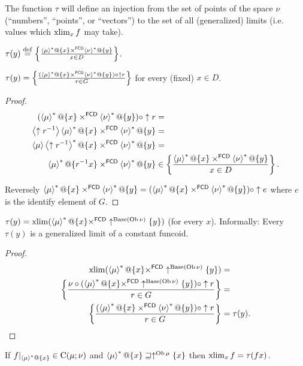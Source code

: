 The function $\tau$ will define an injection from the set of points
of the space $\nu$ (``numbers'', ``points'', or ``vectors'')
to the set of all (generalized) limits (i.e. values which $\operatorname{xlim}_{x}f$
may take).
\begin{defn}
$\tau(y)\overset{\mathrm{def}}{=}\left\{ \frac{\left\langle \mu\right\rangle ^{\ast}@\{x\}\times^{\mathsf{FCD}}\left\langle \nu\right\rangle ^{\ast}@\{y\}}{x\in D}\right\}$.\end{defn}
\begin{prop}
$\tau(y)=\left\{ \frac{(\left\langle \mu\right\rangle ^{\ast}@\{x\}\times^{\mathsf{FCD}}\left\langle \nu\right\rangle ^{\ast}@\{y\})\circ\uparrow r}{r\in G}\right\}$
for every (fixed) $x\in D$.\end{prop}
\begin{proof}
~
\begin{align*}
(\left\langle \mu\right\rangle ^{\ast}@\{x\}\times^{\mathsf{FCD}}\left\langle \nu\right\rangle ^{\ast}@\{y\})\circ\uparrow r & =\\
\left\langle \uparrow r^{-1}\right\rangle\left\langle \mu\right\rangle ^{\ast}@\{x\}\times^{\mathsf{FCD}}\left\langle \nu\right\rangle ^{\ast}@\{y\} & =\\
\left\langle \mu\right\rangle\left\langle \uparrow r^{-1}\right\rangle ^{\ast}@\{x\}\times^{\mathsf{FCD}}\left\langle \nu\right\rangle ^{\ast}@\{y\} & =\\
\left\langle \mu\right\rangle ^{\ast}@\{r^{-1}x\}\times^{\mathsf{FCD}}\left\langle \nu\right\rangle ^{\ast}@\{y\} & \in \left\{ \frac{\left\langle \mu\right\rangle ^{\ast}@\{x\}\times^{\mathsf{FCD}}\left\langle \nu\right\rangle ^{\ast}@\{y\}}{x\in D}\right\}.
\end{align*}


Reversely $\left\langle \mu\right\rangle ^{\ast}@\{x\}\times^{\mathsf{FCD}}\left\langle \nu\right\rangle ^{\ast}@\{y\}=(\left\langle \mu\right\rangle ^{\ast}@\{x\}\times^{\mathsf{FCD}}\left\langle \nu\right\rangle ^{\ast}@\{y\})\circ\uparrow e$
where $e$ is the identify element of $G$.\end{proof}
\begin{prop}
$\tau(y)=\operatorname{xlim}(\left\langle \mu\right\rangle ^{\ast}@\{x\}\times^{\mathsf{FCD}}\uparrow^{\operatorname{Base}(\operatorname{Ob}\nu)}\{y\})$
(for every $x$). Informally: Every $\tau(y)$ is a generalized limit
of a constant funcoid.\end{prop}
\begin{proof}
~
\begin{align*}
\operatorname{xlim}(\left\langle \mu\right\rangle ^{\ast}@\{x\}\times^{\mathsf{FCD}}\uparrow^{\operatorname{Base}(\operatorname{Ob}\nu)}\{y\}) & =\\
\left\{ \frac{\nu\circ(\left\langle \mu\right\rangle ^{\ast}@\{x\}\times^{\mathsf{FCD}}\uparrow^{\operatorname{Base}(\operatorname{Ob}\nu)}\{y\})\circ\uparrow r}{r\in G}\right\} & =\\
\left\{ \frac{(\left\langle \mu\right\rangle ^{\ast}@\{x\}\times^{\mathsf{FCD}}\left\langle \nu\right\rangle ^{\ast}@\{y\})\circ\uparrow r}{r\in G}\right\} & =\tau(y).
\end{align*}
\end{proof}
\begin{thm}
If $f|_{\left\langle \mu\right\rangle ^{\ast}@\{x\}}\in\mathrm{C}(\mu;\nu)$
and $\left\langle \mu\right\rangle ^{\ast}@\{x\}\sqsupseteq\uparrow^{\operatorname{Ob}\mu}\{x\}$
then $\operatorname{xlim}_{x}f=\tau(fx)$.\end{thm}
